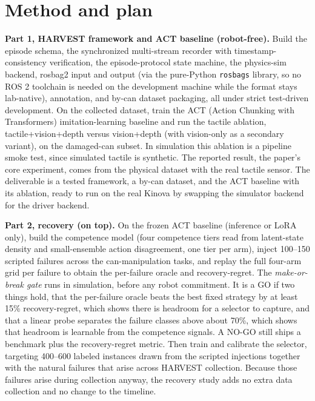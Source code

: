\documentclass[11pt]{article}
\begin{document}
\section{Method and plan}
\textbf{Part 1, HARVEST framework and ACT baseline (robot-free).} Build the episode schema, the synchronized multi-stream recorder with timestamp-consistency verification, the episode-protocol state machine, the physics-sim backend, rosbag2 input and output (via the pure-Python \texttt{rosbags} library, so no ROS 2 toolchain is needed on the development machine while the format stays lab-native), annotation, and by-can dataset packaging, all under strict test-driven development. On the collected dataset, train the ACT (Action Chunking with Transformers) imitation-learning baseline and run the tactile ablation, tactile+vision+depth versus vision+depth (with vision-only as a secondary variant), on the damaged-can subset. In simulation this ablation is a pipeline smoke test, since simulated tactile is synthetic. The reported result, the paper's core experiment, comes from the physical dataset with the real tactile sensor. The deliverable is a tested framework, a by-can dataset, and the ACT baseline with its ablation, ready to run on the real Kinova by swapping the simulator backend for the driver backend.

\textbf{Part 2, recovery (on top).} On the frozen ACT baseline (inference or LoRA only), build the competence model (four competence tiers read from latent-state density and small-ensemble action disagreement, one tier per arm), inject 100--150 scripted failures across the can-manipulation tasks, and replay the full four-arm grid per failure to obtain the per-failure oracle and recovery-regret. The \emph{make-or-break gate} runs in simulation, before any robot commitment. It is a GO if two things hold, that the per-failure oracle beats the best fixed strategy by at least 15\% recovery-regret, which shows there is headroom for a selector to capture, and that a linear probe separates the failure classes above about 70\%, which shows that headroom is learnable from the competence signals. A NO-GO still ships a benchmark plus the recovery-regret metric. Then train and calibrate the selector, targeting 400--600 labeled instances drawn from the scripted injections together with the natural failures that arise across HARVEST collection. Because those failures arise during collection anyway, the recovery study adds no extra data collection and no change to the timeline.
\end{document}
